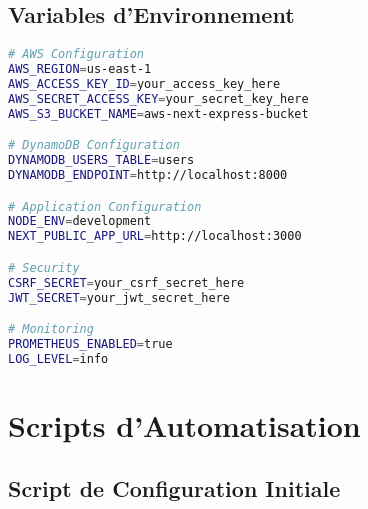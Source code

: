 \subsection{Variables d'Environnement}

\begin{lstlisting}[language=bash, caption=env.example]
# AWS Configuration
AWS_REGION=us-east-1
AWS_ACCESS_KEY_ID=your_access_key_here
AWS_SECRET_ACCESS_KEY=your_secret_key_here
AWS_S3_BUCKET_NAME=aws-next-express-bucket

# DynamoDB Configuration
DYNAMODB_USERS_TABLE=users
DYNAMODB_ENDPOINT=http://localhost:8000

# Application Configuration
NODE_ENV=development
NEXT_PUBLIC_APP_URL=http://localhost:3000

# Security
CSRF_SECRET=your_csrf_secret_here
JWT_SECRET=your_jwt_secret_here

# Monitoring
PROMETHEUS_ENABLED=true
LOG_LEVEL=info
\end{lstlisting}

\section{Scripts d'Automatisation}

\subsection{Script de Configuration Initiale}

